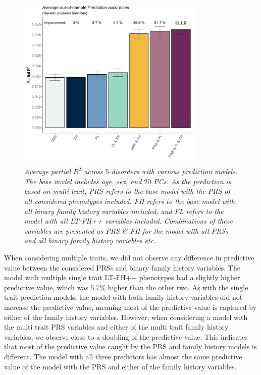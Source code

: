 \begin{figure}[h]
	\centering
	\includegraphics[width=0.8\textwidth]{results/Average_out-of-sample_partial_correlations_multi_trait.jpeg}	\caption[Average out-of-sample prediction for multi trait]{
		\sl Average partial $ R^2 $ across $ 5 $ disorders with various prediction models. The base model includes age, sex, and $ 20 $ PCs. As the prediction is based on multi trait, \textit{PRS} refers to the base model with the PRS of all considered phenotypes included. \textit{FH} refers to the base model with all binary family history variables included, and \textit{FL} refers to the model with all LT-FH++ variables included. Combinations of these variables are presented as \textit{PRS} \& \textit{FH} for the model with all PRSs and all binary family history variables etc..}
	\label{fig:paper3:predictionResultsMultiTrait}
\end{figure}

When considering multiple traits, we did not observe any difference in predictive value between the considered PRSs and binary family history variables. The model with multiple single trait LT-FH++ phenotypes had a slightly higher predictive value, which was $ 5.7\% $ higher than the other two. As with the single trait prediction models, the model with both family history variables did not increase the predictive value, meaning most of the predictive value is captured by either of the family history variables. However, when considering a model with the multi trait PRS variables and either of the multi trait family history variables, we observe close to a doubling of the predictive value. This indicates that most of the predictive value caught by the PRS and family history models is different. The model with all three predictors has almost the same predictive value of the model with the PRS and either of the family history variables.


